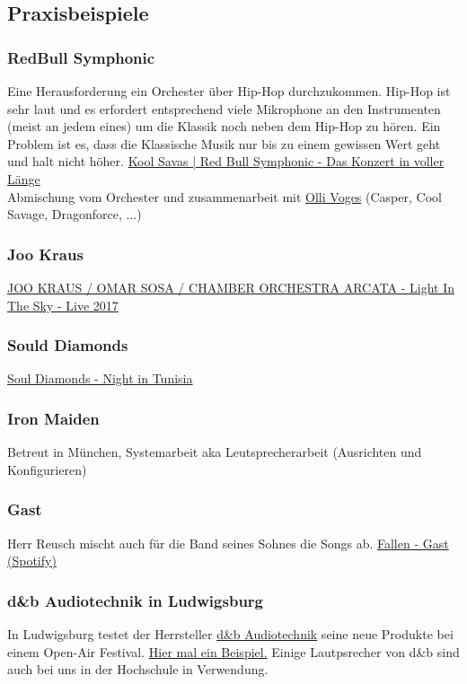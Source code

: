 \subsection{Praxisbeispiele}

\subsubsection{RedBull Symphonic}
Eine Herausforderung ein Orchester über Hip-Hop durchzukommen. Hip-Hop ist sehr laut und es erfordert entsprechend viele Mikrophone an den Instrumenten (meist an jedem eines) um die Klassik noch neben dem Hip-Hop zu hören. Ein Problem ist es, dass die Klassische Musik nur bis zu einem gewissen Wert geht und halt nicht höher.
\href{https://youtu.be/2s__lEzWqo4?si=bGhVtFCQNC-s5NzL}{Kool Savas | Red Bull Symphonic - Das Konzert in voller Länge}\\
Abmischung vom Orchester und zusammenarbeit mit \href{https://de.linkedin.com/in/oliver-voges-ab151672}{Olli Voges} (Casper, Cool Savage, Dragonforce, ...)

\subsubsection{Joo Kraus}
\href{https://youtu.be/hrD4D0ShFBY?si=8nK3cuIGO_KtiYv7}{JOO KRAUS / OMAR SOSA / CHAMBER ORCHESTRA ARCATA - Light In The Sky - Live 2017} 

\subsubsection{Sould Diamonds}
\href{https://youtu.be/EeIQMoYi3gU?si=_4K6PZCx4HAfOsjd}{Soul Diamonds - Night in Tunisia}

\subsubsection{Iron Maiden}
Betreut in München, Systemarbeit aka Leutsprecherarbeit (Ausrichten und Konfigurieren)

\subsubsection{Gast}
Herr Reusch mischt auch für die Band seines Sohnes die Songs ab. \href{https://open.spotify.com/intl-de/track/65qo8OLrleFH5bUOsDxRUo?si=49a2ccd60e154820}{Fallen - Gast (Spotify)}

\subsubsection{d\&b Audiotechnik in Ludwigsburg}
In Ludwigsburg testet der Herrsteller \href{https://www.dbaudio.com/global/de/}{d\&b Audiotechnik} seine neue Produkte bei einem Open-Air Festival. \href{https://youtu.be/UBUGswe_Grw?si=p8W6tscHZTbGxhpX}{Hier mal ein Beispiel.} Einige Lautpsrecher von d\&b sind auch bei uns in der Hochschule in Verwendung.
\newpage

